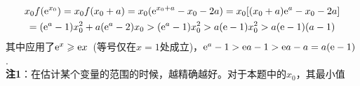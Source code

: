 \begin{enumerate}[label={【\textbf{例\thechapter.\arabic*}】},
 leftmargin=\inteval{\myenumleftmargin}pt,
 itemsep=\inteval{\myenumitempsep}pt,
 itemindent=\inteval{\myenumitemindent}pt]
\begin{gather*}
    x_0f(\mathrm{e}^{x_0})=x_0f(x_0+a)=x_0(\mathrm{e}^{x_0+a}-x_0-2a)=x_0[(x_0+a)\mathrm{e}^a-x_0-2a]\\
    =(\mathrm{e}^a-1)x_0^2+a(\mathrm{e}^a-2)x_0 >(\mathrm{e}^a-1)x_0^2>a(\mathrm{e}-1)x_0^2>a(\mathrm{e}-1)(a-1)
\end{gather*}
其中应用了$ \mathrm{e}^x\geqslant \mathrm{e} x $\ (等号仅在$ x=1 $处成立)，$ \mathrm{e}^a-1>\mathrm{e} a-1>\mathrm{e} a-a=a(\mathrm{e}-1) $. \\
%
\textbf{注1}：在估计某个变量的范围的时候，越精确越好。对于本题中的$ x_0 $，其最小值

\end{enumerate}

